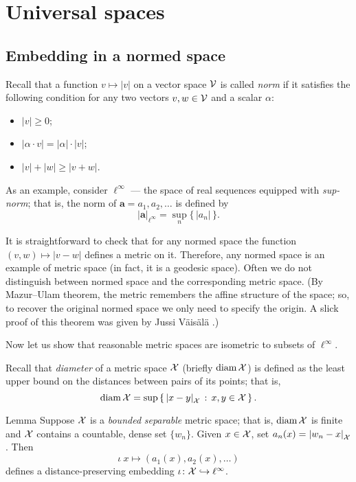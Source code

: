 \chapter{Universal spaces}

\section{Embedding in a normed space}

Recall that a function $v\mapsto |v|$ on a vector space $\mathcal{V}$ is called \emph{norm} if it satisfies the following condition for any two vectors $v,w\in \mathcal{V}$ and a scalar $\alpha$:
\begin{itemize}
\item $|v|\ge 0$;
\item $|\alpha\cdot v|=|\alpha|\cdot |v|$;
\item $|v|+|w|\ge|v+w|$.
\end{itemize}

As an example, consider \index{$\ell^\infty$}$\ell^\infty$ --- the space of real sequences equipped with \emph{sup-norm}; that is, the norm of $\bm{a}=a_1,a_2,\dots$ is defined by
\[|\bm{a}|_{\ell^\infty}=\sup_n\{\,|a_n|\,\}.\]


It is straightforward to check that for any normed space the function $(v,w)\mapsto |v-w|$ defines a metric on it.
Therefore, any normed space is an example of metric space (in fact, it is a geodesic space).
Often we do not distinguish between normed space and the corresponding metric space.
(By Mazur--Ulam theorem, the metric remembers the affine structure of the space; so, to recover the original normed space we only need to specify the origin.
A slick proof of this theorem was given by Jussi V\"{a}is\"{a}l\"{a} \cite{vaisala}.)

Now let us show that reasonable metric spaces are isometric to subsets of $\ell^\infty$.

Recall that \emph{diameter} of a metric space $\mathcal{X}$ (briefly $\operatorname{\rm diam}\nolimits \mathcal{X}$) is defined as the least upper bound on the distances between pairs of its points;
that is,
\[\diam \spc{X}=\sup\set{\dist{x}{y}{\spc{X}}}{x,y\in \spc{X}}.\]



\begin{thm}{Lemma}\label{lem:frechet}
Suppose $\mathcal{X}$ is a \emph{bounded} \emph{separable} metric space;
that is, $\operatorname{\rm diam}\nolimits\mathcal{X}$ is finite and $\mathcal{X}$ contains a countable, dense set $\{w_n\}$.
Given $x\in \mathcal{X}$, set $a_n(x)=\dist{w_n}{x}{\spc{X}}$.
Then 
\[\iota\:x\mapsto (a_1(x), a_2(x),\dots)\]
defines a distance-preserving embedding $\iota\colon\mathcal{X}\hookrightarrow \ell^\infty$.
\end{thm}

